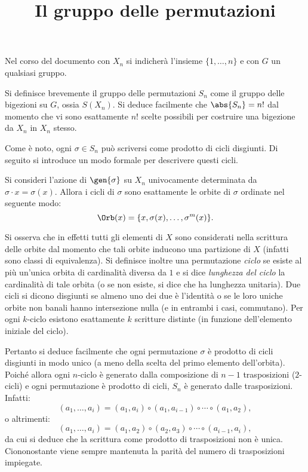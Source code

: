 \documentclass[12pt]{scrartcl}
\begin{document}
	\title{Il gruppo delle permutazioni}
	\maketitle
	
	\begin{note}
		Nel corso del documento con $X_n$ si indicherà l'insieme
		$\{1, \ldots, n\}$ e con $G$ un qualsiasi gruppo.
	\end{note}

	Si definisce brevemente il gruppo delle permutazioni $S_n$ come il gruppo
	delle bigezioni su $G$, ossia $S(X_n)$. Si deduce facilmente che
	$\abs{S_n} = n!$ dal momento che vi sono esattamente $n!$ scelte possibili
	per costruire una bigezione da $X_n$ in $X_n$ stesso. \medskip
	
	
	Come è noto, ogni $\sigma \in S_n$ può scriversi come prodotto di cicli
	disgiunti. Di seguito si introduce un modo formale per descrivere questi
	cicli. \medskip
	
	
	Si consideri l'azione di $\gen{\sigma}$ su $X_n$ univocamente determinata
	da $\sigma \cdot x = \sigma(x)$. Allora i cicli di $\sigma$ sono esattamente
	le orbite di $\sigma$ ordinate nel seguente modo:
	\[ \Orb(x) = \{ x, \sigma(x), \dots, \sigma^m(x) \}. \]

	
	Si osserva che in effetti tutti gli elementi di $X$ sono considerati nella
	scrittura delle orbite dal momento che tali orbite inducono una partizione
	di $X$ (infatti sono classi di equivalenza). Si definisce inoltre una
	permutazione \textit{ciclo} se esiste al più un'unica orbita di cardinalità diversa
	da $1$ e si dice \textit{lunghezza del ciclo} la cardinalità di tale orbita (o se non esiste, si dice che ha lunghezza unitaria). Due cicli si dicono disgiunti se almeno uno dei due è l'identità o se le loro uniche orbite non banali hanno intersezione nulla (e in entrambi i casi, commutano). Per ogni $k$-ciclo esistono esattamente $k$ scritture
	distinte (in funzione dell'elemento iniziale del ciclo). \medskip
	
	
	Pertanto si deduce facilmente che ogni permutazione $\sigma$ è prodotto
	di cicli disgiunti in modo unico (a meno della scelta del primo elemento
	dell'orbita). Poiché allora ogni $n$-ciclo è generato dalla composizione
	di $n-1$ trasposizioni ($2$-cicli) e ogni permutazione è prodotto di cicli,
	$S_n$ è generato dalle trasposizioni. Infatti:
	\[ (a_1, \dots, a_i) = (a_1, a_i) \circ (a_1, a_{i-1}) \circ \cdots \circ (a_1, a_2), \]
	o altrimenti:
	\[ (a_1, \dots, a_i) = (a_1, a_2) \circ (a_2, a_3) \circ \cdots \circ (a_{i-1}, a_i), \]
	da cui si deduce che la scrittura come prodotto di
	trasposizioni non è unica. Ciononostante viene sempre mantenuta la parità
	del numero di trasposizioni impiegate. \medskip
	
\end{document}
